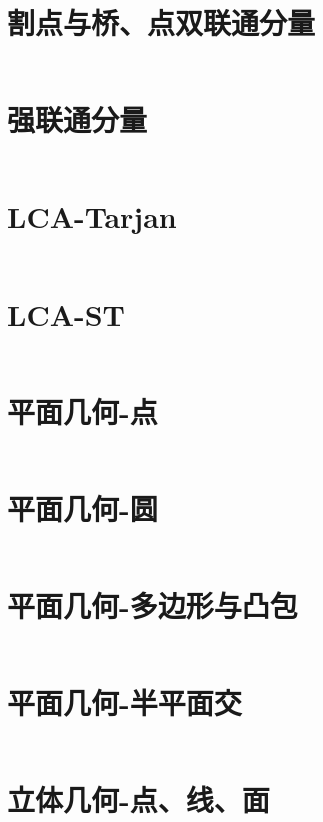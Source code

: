 \documentclass[titlepage,landscape,a4paper,10pt]{article}
\begin{document}
\begin{multicols}{2}
\begin{spacing}{0.8}
\section{割点与桥、点双联通分量}
\inputminted{cpp}{/Users/Corn/Desktop/Code/ACM_SCL/code/cut_bridge_bcc.cpp}

\section{强联通分量}
\inputminted{cpp}{/Users/Corn/Desktop/Code/ACM_SCL/code/scc.cpp}

\section{LCA-Tarjan}
\inputminted{cpp}{/Users/Corn/Desktop/Code/ACM_SCL/code/LCA_Tarjan.cpp}

\section{LCA-ST}
\inputminted{cpp}{/Users/Corn/Desktop/Code/ACM_SCL/code/LCA_ST.cpp}

\section{平面几何-点}
\inputminted{cpp}{/Users/Corn/Desktop/Code/ACM_SCL/code/Point.cpp}

\section{平面几何-圆}
\inputminted{cpp}{/Users/Corn/Desktop/Code/ACM_SCL/code/circle.cpp}

\section{平面几何-多边形与凸包}
\inputminted{cpp}{/Users/Corn/Desktop/Code/ACM_SCL/code/convex.cpp}

\section{平面几何-半平面交}
\inputminted{cpp}{/Users/Corn/Desktop/Code/ACM_SCL/code/Phalf.cpp}

\section{立体几何-点、线、面}
\inputminted{cpp}{/Users/Corn/Desktop/Code/ACM_SCL/code/Geo3D_Base.cpp}


\end{spacing}
\end{multicols}
\end{document}
